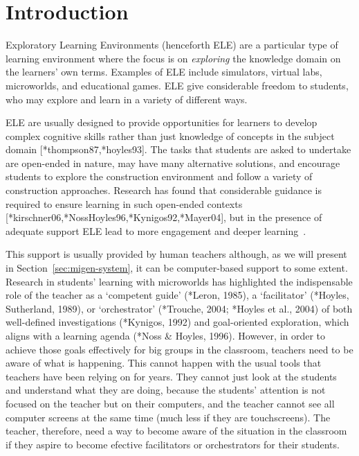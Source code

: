 
\section{Introduction}
\label{sec:introduction}

Exploratory Learning Environments (henceforth ELE) are a particular
type of learning environment where the focus is on \emph{exploring}
the knowledge domain on the learners' own terms. Examples of ELE
include simulators, virtual labs, microworlds, and educational
games. ELE give considerable freedom to students, who may explore and
learn in a variety of different ways.

ELE are usually designed to provide opportunities for learners to
develop complex 
cognitive skills rather than just knowledge of concepts in the subject
domain [*thompson87,*hoyles93]. The tasks that students are asked to
undertake are open-ended in nature, may have many alternative
solutions, and encourage students to explore the construction
environment and follow a variety of construction approaches. Research
has found that considerable guidance is required to ensure learning in
such open-ended contexts [*kirschner06,*NossHoyles96,*Kynigos92,*Mayer04],
but in the presence of adequate support ELE lead to more engagement
and deeper learning~\cite{deeperLearning}. 

This support is usually provided by human teachers although, as we
will present in Section~\ref{sec:migen-system}, it can be
computer-based support to some extent.
Research in students’ learning with microworlds has highlighted
the indispensable role of the teacher as a ‘competent guide’ (*Leron,
1985), a ‘facilitator’ (*Hoyles, Sutherland, 1989), or ‘orchestrator’
(*Trouche, 2004; *Hoyles et al., 2004) of both well-defined
investigations (*Kynigos, 1992) and goal-oriented exploration, which
aligns with a learning agenda (*Noss \& Hoyles, 1996). However, in
order to achieve those goals effectively for big groups in the
classroom, teachers need to be aware of what is happening. This cannot
happen with the usual tools that teachers have been relying on for
years. They cannot just look at the students and understand what they
are doing, because the students' attention is not focused on the
teacher but on their computers, and the teacher cannot see all
computer screens at the same time (much less if they are
touchscreens). The teacher, therefore, need a way to become aware of
the situation in the classroom if they aspire to become efective
facilitators or orchestrators for their students. 

